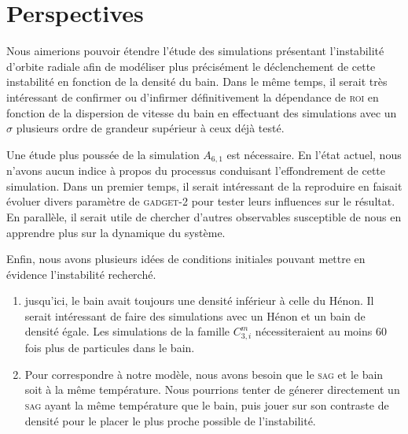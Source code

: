 \documentclass[a4paper,11pt,twoside,openright]{report}
\renewcommand{\(}{\ensuremath{\left(}}
\renewcommand{\)}{\ensuremath{\right)}}
\begin{document}
		\section{Perspectives}

			Nous aimerions pouvoir étendre l'étude des simulations présentant l'instabilité d'orbite radiale afin de modéliser plus
			précisément le déclenchement de cette instabilité en fonction de la densité du bain. Dans le même temps, il serait très
			intéressant de confirmer ou d'infirmer définitivement la dépendance de \textsc{roi} en fonction de la dispersion de vitesse du
			bain en effectuant des simulations avec un $\sigma$ plusieurs ordre de grandeur supérieur à ceux déjà testé.

			Une étude plus poussée de la simulation $A_{6,1}$ est nécessaire. En l'état actuel, nous n'avons aucun indice à propos du processus
			conduisant l'effondrement de cette simulation. Dans un premier temps, il serait intéressant de la reproduire en faisait
			évoluer divers paramètre de \textsc{gadget-2} pour tester leurs influences sur le résultat. En parallèle, il serait utile de
			chercher d'autres observables susceptible de nous en apprendre plus sur la dynamique du système.

			Enfin, nous avons plusieurs idées de conditions initiales pouvant mettre en évidence l'instabilité recherché.
			\begin{enumerate}
				\item jusqu'ici, le bain avait toujours une densité inférieur à celle du Hénon. Il serait intéressant de faire des
					simulations avec un Hénon et un bain de densité égale. Les simulations de la famille $C^m_{3,i}$ nécessiteraient au moins $60$ fois plus
					de particules dans le bain.



				\item Pour correspondre à notre modèle, nous avons besoin que le \textsc{sag} et le bain soit à la même température.
					Nous pourrions tenter de génerer directement un \textsc{sag} ayant la même température que le bain, puis jouer
					sur son contraste de densité pour le placer le plus proche possible de l'instabilité.

			\end{enumerate}
\end{document}
